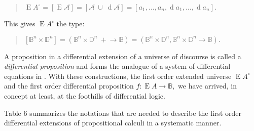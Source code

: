 \documentclass[12pt]{article}
\begin{document}
\begin{itemize}
\begin{quote}
$\operatorname{E}A^\circ = [ \operatorname{E}\mathcal{A} ] = [ \mathcal{A}\ \cup\ \operatorname{d}\mathcal{A} ] = [ a_1, \ldots, a_n, \operatorname{d}a_1, \ldots, \operatorname{d}a_n ].$
\end{quote}

This gives $\operatorname{E}A^\circ$ the type:

\begin{quote}
$[ \mathbb{B}^n \times \mathbb{D}^n ] = (\mathbb{B}^n \times \mathbb{D}^n\ +\!\to \mathbb{B}) = (\mathbb{B}^n \times \mathbb{D}^n, \mathbb{B}^n \times \mathbb{D}^n \to \mathbb{B}).$
\end{quote}

\end{itemize}

A proposition in a differential extension of a universe of discourse is called a \textit{differential proposition} and forms the analogue of a system of differential equations in .  With these constructions, the first order extended universe $\operatorname{E}A^\circ$ and the first order differential proposition $f : \operatorname{E}A \to \mathbb{B},$ we have arrived, in concept at least, at the foothills of differential logic.

Table 6 summarizes the notations that are needed to describe the first order differential extensions of propositional calculi in a systematic manner.
\end{document}
